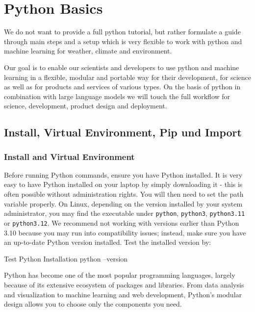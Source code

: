 \chapter{Python Basics}

We do not want to provide a full python tutorial, but rather formulate a guide through main steps and a setup which is very flexible to work with python and machine learning for weather, climate and environment. 

Our goal is to enable our scientists and developers to use python and machine learning in a flexible, modular and portable way for their development, for science as well as for products and services of various types. On the basis of python in combination with large language models we will touch the full workflow for science, development, product design and deployment. 

\section{Install, Virtual Environment, Pip und Import}

\subsection{Install and Virtual Environment}
\label{sec:virtualenv}

Before running Python commands, ensure you have Python installed. It is very easy to have Python installed on your laptop by simply downloading it - this is often possible without administration rights. You will then need to set the path variable properly. On Linux, depending on the version installed by your system administrator, you may find the executable under \texttt{python}, \texttt{python3}, \texttt{python3.11} or \texttt{python3.12}. We recommend not working with versions earlier than Python 3.10 because you may run into compatibility issues; instead, make sure you have an up-to-date Python version installed. Test the installed version by:

\begin{codeonly}{Test Python Installation}
python --version 
\end{codeonly}
  
Python has become one of the most popular programming languages, largely because of its extensive ecosystem of packages and libraries. From data analysis and visualization to machine learning and web development, Python's modular design allows you to choose only the components you need.

